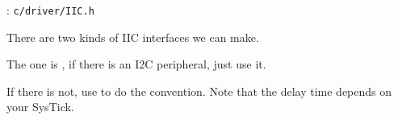 
: \verb`c/driver/IIC.h`

There are two kinds of IIC interfaces we can make.

The one is , if there is an I2C peripheral, just use it.

If there is not, use  to do the convention.
Note that the delay time depends on your SysTick.
